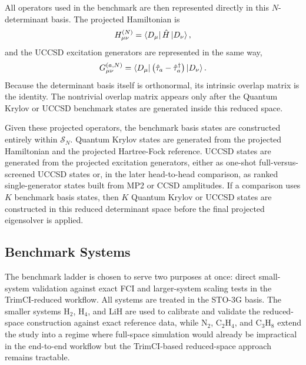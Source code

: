 All operators used in the benchmark are then represented directly in this $N$-determinant basis. The projected Hamiltonian is
\begin{equation}
H^{(N)}_{\mu \nu} = \bra{D_{\mu}} \hat{H} \ket{D_{\nu}},
\end{equation}
and the UCCSD excitation generators are represented in the same way,
\begin{equation}
G^{(a,N)}_{\mu \nu} = \bra{D_{\mu}} \left(\hat{\tau}_{a} - \hat{\tau}_{a}^{\dagger}\right) \ket{D_{\nu}}.
\end{equation}
Because the determinant basis itself is orthonormal, its intrinsic overlap matrix is the identity. The nontrivial overlap matrix appears only after the Quantum Krylov or UCCSD benchmark states are generated inside this reduced space.

Given these projected operators, the benchmark basis states are constructed entirely within $\mathcal{S}_{N}$. Quantum Krylov states are generated from the projected Hamiltonian and the projected Hartree-Fock reference. UCCSD states are generated from the projected excitation generators, either as one-shot full-versus-screened UCCSD states or, in the later head-to-head comparison, as ranked single-generator states built from MP2 or CCSD amplitudes. If a comparison uses $K$ benchmark basis states, then $K$ Quantum Krylov or UCCSD states are constructed in this reduced determinant space before the final projected eigensolver is applied.

\subsection{Benchmark Systems}

The benchmark ladder is chosen to serve two purposes at once: direct small-system validation against exact FCI and larger-system scaling tests in the TrimCI-reduced workflow. All systems are treated in the STO-3G basis. The smaller systems H$_2$, H$_4$, and LiH are used to calibrate and validate the reduced-space construction against exact reference data, while N$_2$, C$_2$H$_4$, and C$_3$H$_8$ extend the study into a regime where full-space simulation would already be impractical in the end-to-end workflow but the TrimCI-based reduced-space approach remains tractable.


